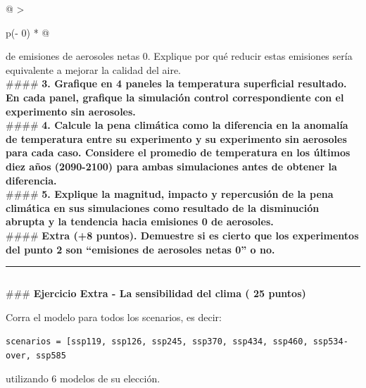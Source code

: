 \documentclass[11pt]{article}
\makeatletter
\newcommand{\boxspacing}{\kern\kvtcb@left@rule\kern\kvtcb@boxsep}
\newcommand{\prompt}[4]{
        {\ttfamily\llap{{\color{#2}[#3]:\hspace{3pt}#4}}\vspace{-\baselineskip}}
    }
\makeatother
\begin{document}
\begin{longtable}[]{@{}
  >{\raggedright\arraybackslash}p{(\columnwidth - 0\tabcolsep) * }@{}}
{de emisiones de aerosoles netas 0. Explique por qué reducir estas
emisiones sería equivalente a mejorar la calidad del aire. } \\
\#\#\#\# \textbf{ 3. Grafique en 4 paneles la temperatura superficial
resultado. En cada panel, grafique la simulación control correspondiente
con el experimento sin aerosoles. } \\
\#\#\#\# \textbf{ 4. Calcule la pena climática como la diferencia en la
anomalía de temperatura entre su experimento y su experimento sin
aerosoles para cada caso. Considere el promedio de temperatura en los
últimos diez años (2090-2100) para ambas simulaciones antes de obtener
la diferencia. } \\
\#\#\#\# \textbf{ 5. Explique la magnitud, impacto y repercusión de la
pena climática en sus simulaciones como resultado de la disminución
abrupta y la tendencia hacia emisiones 0 de aerosoles. } \\
\#\#\#\# \textbf{ Extra (+8 puntos). Demuestre si es cierto que los
experimentos del punto 2 son ``emisiones de aerosoles netas 0'' o no.
} \\
\bottomrule
\end{longtable}

\begin{center}\rule{0.5\linewidth}{0.5pt}\end{center}

    \begin{tcolorbox}[breakable, size=fbox, boxrule=1pt, pad at break*=1mm,colback=cellbackground, colframe=cellborder]
\prompt{In}{incolor}{ }{\boxspacing}
\begin{Verbatim}[commandchars=\\\{\}]

\end{Verbatim}
\end{tcolorbox}

    \#\#\# \textbf{ Ejercicio Extra - La sensibilidad del clima ( 25 puntos)
}

Corra el modelo para todos los scenarios, es decir:

\texttt{scenarios\ =\ {[}\textquotesingle{}ssp119\textquotesingle{},\ \textquotesingle{}ssp126\textquotesingle{},\ \textquotesingle{}ssp245\textquotesingle{},\ \textquotesingle{}ssp370\textquotesingle{},\ \textquotesingle{}ssp434\textquotesingle{},\ \textquotesingle{}ssp460\textquotesingle{},\ \textquotesingle{}ssp534-over\textquotesingle{},\ \textquotesingle{}ssp585\textquotesingle{}{]}}

utilizando 6 modelos de su elección.
\end{document}
